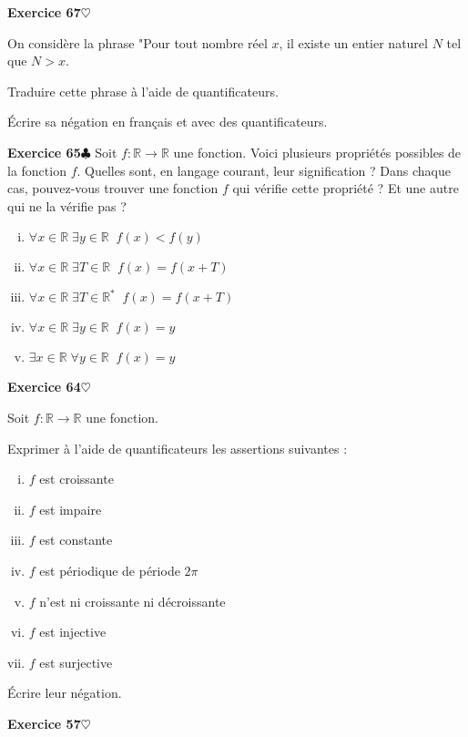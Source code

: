 ﻿\documentclass[11pt,a4paper]{amsart}
\theoremstyle{theorem}
\theoremstyle{definition}
\newcommand{\coeur}{$\heartsuit$}
\newcommand{\trefle}{$\clubsuit$}
\def\RR{{\mathbb R}}
\newcounter{qcounter}
\newcounter{qscounter}
\begin{document}
\setcounter{qcounter}{0} \setcounter{qscounter}{0}\textbf{Exercice 67}{\coeur}

On considère la phrase "Pour tout nombre réel $x$, il existe un entier naturel $N$ tel que $N>x$.

\question Traduire cette phrase à l'aide de quantificateurs.

\question \'Ecrire sa négation en français et avec des quantificateurs.


\setcounter{qcounter}{0} \setcounter{qscounter}{0}\textbf{Exercice 65}{\trefle}
Soit $f:\RR\to\RR$ une fonction. Voici plusieurs propriétés possibles de la fonction $f$. Quelles sont, en langage courant, leur signification ? Dans chaque cas, pouvez-vous trouver une fonction $f$ qui vérifie cette propriété ? Et une autre qui ne la vérifie pas ?

\begin{enumerate}[(i)]
\item $\forall x\in \RR\; \exists y\in \RR \;\; f(x)<f(y)$
\item $\forall x\in \RR \; \exists T\in \RR \;\; f(x)=f(x+T)$
\item $\forall x\in \RR \;\exists T\in \RR^* \;\; f(x)=f(x+T)$
\item $\forall x\in \RR \; \exists y\in \RR \;\; f(x)=y$
\item $\exists x\in \RR \; \forall y\in \RR\;\; f(x)=y$
\end{enumerate}

\setcounter{qcounter}{0} \setcounter{qscounter}{0}\textbf{Exercice 64}{\coeur}

Soit $f:\RR\to\RR$ une fonction. 

\question Exprimer à l'aide de quantificateurs les assertions suivantes :

\begin{enumerate}[(i)]
\item $f$ est croissante
\item $f$ est impaire
\item $f$ est constante
\item $f$ est périodique de période $2\pi$
\item $f$ n'est ni croissante ni décroissante
\item $f$ est injective
\item $f$ est surjective
\end{enumerate}

\question \'Ecrire leur négation.




\setcounter{qcounter}{0} \setcounter{qscounter}{0}\textbf{Exercice 57}{\coeur}
\end{document}
